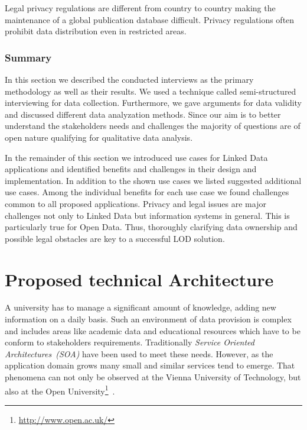 \documentclass{article}
\begin{document}
Legal privacy regulations are different from country to country making the maintenance of a global publication database difficult. Privacy regulations often prohibit data distribution even in restricted areas. 
\subsubsection{Summary}
In this section we described the conducted interviews as the primary methodology as well as their results. We used a technique called semi-structured interviewing for data collection. Furthermore, we gave arguments for data validity and discussed different data analyzation methods. Since our aim is to better understand the stakeholders needs and challenges the majority of questions are of open nature qualifying for qualitative data analysis. 

In the remainder of this section we introduced use cases for Linked Data applications and identified benefits and challenges in their design and implementation. In addition to the shown use cases we listed suggested additional use cases. Among the individual benefits for each use case we found challenges common to all proposed applications. Privacy and legal issues are major challenges not only to Linked Data but information systems in general. This is particularly true for Open Data. Thus, thoroughly clarifying data ownership and possible legal obstacles are key to a successful LOD solution.  

\section{Proposed technical Architecture}
A university has to manage a significant amount of knowledge, adding new information on a daily basis.
Such an environment of data provision is complex and includes areas like academic data and educational resources which have to be conform to stakeholders requirements. Traditionally \textit{Service Oriented Architectures~(SOA)} have been used to meet these needs. However, as the application domain grows many small and similar services tend to emerge. That phenomena can not only be observed at the Vienna University of Technology, but also at the Open University\footnote{\url{http://www.open.ac.uk/}}~\cite{inproceedings:zablith_consuming_2011}.
\end{document}
